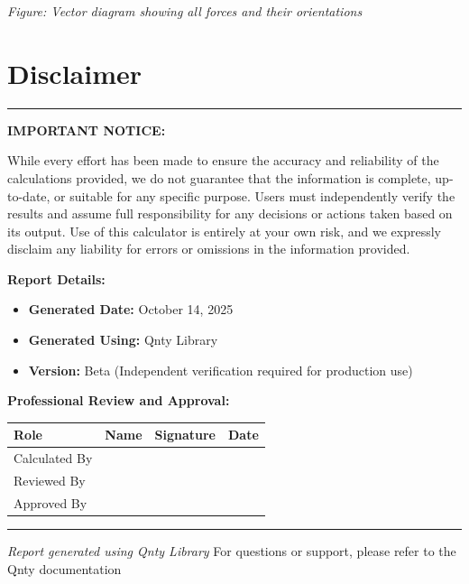 \documentclass[11pt,a4paper]{article}
\begin{document}
\begin{center}
\textit{Figure: Vector diagram showing all forces and their orientations}
\end{center}


\clearpage

\section*{Disclaimer}

\begin{center}
\rule{\textwidth}{0.4pt}
\end{center}

\noindent\textbf{IMPORTANT NOTICE:}

\noindent While every effort has been made to ensure the accuracy and reliability of the calculations provided, we do not guarantee that the information is complete, up-to-date, or suitable for any specific purpose. Users must independently verify the results and assume full responsibility for any decisions or actions taken based on its output. Use of this calculator is entirely at your own risk, and we expressly disclaim any liability for errors or omissions in the information provided.

\vspace{1em}

\noindent\textbf{Report Details:}
\begin{itemize}
\item \textbf{Generated Date:} October 14, 2025
\item \textbf{Generated Using:} Qnty Library
\item \textbf{Version:} Beta (Independent verification required for production use)
\end{itemize}

\vspace{2em}

\noindent\textbf{Professional Review and Approval:}

\vspace{1em}

\begin{longtable}{|p{3cm}|p{4cm}|p{4cm}|p{2.5cm}|}
\hline
\textbf{Role} & \textbf{Name} & \textbf{Signature} & \textbf{Date} \\
\hline
\hline
Calculated By & \rule{0pt}{1.5cm} & & \\
\hline
Reviewed By & \rule{0pt}{1.5cm} & & \\
\hline
Approved By & \rule{0pt}{1.5cm} & & \\
\hline
\end{longtable}

\vspace{1em}

\begin{center}
\rule{\textwidth}{0.4pt}
\vspace{0.5em}
\textit{Report generated using Qnty Library}
\vspace{0.5em}
{\footnotesize For questions or support, please refer to the Qnty documentation}
\end{center}
\end{document}
